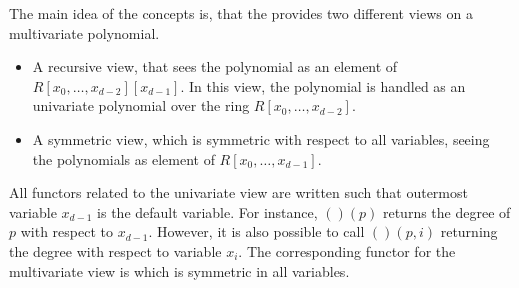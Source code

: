 The main idea of the concepts is, that the  provides two 
different views on a multivariate polynomial. 

\begin{itemize}
\item 
A recursive view, that sees the polynomial as an element of 
$R[x_0,\dots,x_{d-2}][x_{d-1}]$. In this view, the polynomial is handled as
an univariate polynomial over the ring $R[x_0,\dots,x_{d-2}]$. 
\item 
A symmetric view, which is symmetric with respect to all variables,
seeing the polynomials as element of $R[x_0,\dots,x_{d-1}]$.
\end{itemize}

All functors related to the univariate view are written such that 
outermost variable $x_{d-1}$ is the default variable. For instance, 
$()(p)$ returns the degree of $p$ with respect to $x_{d-1}$. 
However, it is also possible to call 
$()(p,i)$ returning the 
degree with respect to variable $x_{i}$. The corresponding functor for the 
multivariate view is  which is 
symmetric in all variables. 